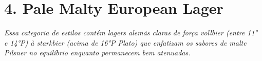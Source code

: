 \section*{4. Pale Malty European Lager}
\textit{Essa categoria de estilos contém lagers alemãs claras de força vollbier (entre 11° e 14°P) à starkbier (acima de 16°P Plato) que enfatizam os sabores de malte Pilsner no equilíbrio enquanto permanecem bem atenuadas.}
